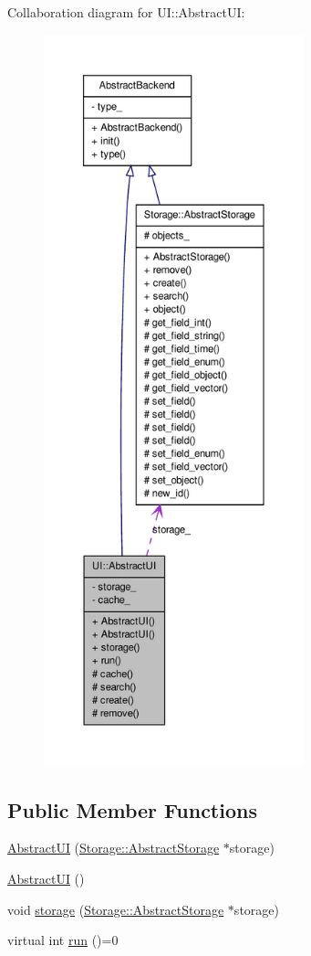 Collaboration diagram for UI::AbstractUI:
\nopagebreak
\begin{figure}[H]
\begin{center}
\leavevmode
\includegraphics[height=600pt]{d3/d7d/classUI_1_1AbstractUI__coll__graph}
\end{center}
\end{figure}
\subsection*{Public Member Functions}
\begin{DoxyCompactItemize}
\item 
\hyperlink{classUI_1_1AbstractUI_a1e1e9c38734ce06605ab34ae178255de}{AbstractUI} (\hyperlink{classStorage_1_1AbstractStorage}{Storage::AbstractStorage} $\ast$storage)
\item 
\hyperlink{classUI_1_1AbstractUI_ab7eccb3e8bbaf0161d6a2c60197ede66}{AbstractUI} ()
\item 
void \hyperlink{classUI_1_1AbstractUI_ac724d598f9b90d72ec9dc4777f92d43b}{storage} (\hyperlink{classStorage_1_1AbstractStorage}{Storage::AbstractStorage} $\ast$storage)
\item 
virtual int \hyperlink{classUI_1_1AbstractUI_af9b66b441b76c88fe645a02d33138159}{run} ()=0
\end{DoxyCompactItemize}
